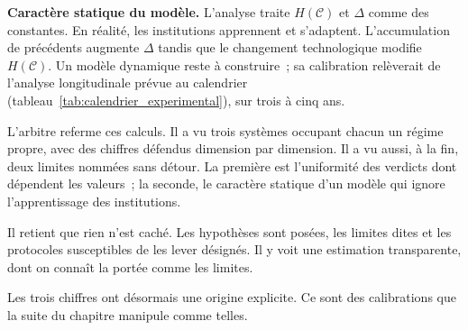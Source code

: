 \begin{sloppypar}
\noindent\textbf{Caract\`ere statique du mod\`ele.} L'analyse traite
$H(\mathcal{C})$ et $\Delta$ comme des constantes. En r\'ealit\'e, les
institutions apprennent et s'adaptent. L'accumulation de pr\'ec\'edents
augmente $\Delta$ tandis que le changement technologique modifie $H(\mathcal{C})$. Un
mod\`ele dynamique reste \`a construire~; sa calibration rel\`everait de l'analyse
longitudinale pr\'evue au calendrier (tableau~\ref{tab:calendrier_experimental}),
sur trois \`a cinq ans.

\begin{boiteArbitre}
L'arbitre referme ces calculs. Il a vu trois syst\`emes occupant chacun un r\'egime
propre, avec des chiffres d\'efendus dimension par dimension. Il a vu aussi, \`a la fin,
deux limites nomm\'ees sans d\'etour. La premi\`ere est l'uniformit\'e des verdicts dont
d\'ependent les valeurs~; la seconde, le caract\`ere statique d'un mod\`ele qui ignore
l'apprentissage des institutions.

Il retient que rien n'est cach\'e. Les hypoth\`eses sont pos\'ees, les limites
dites et les protocoles susceptibles de les lever d\'esign\'es. Il y voit une estimation
transparente, dont on conna\^it la port\'ee comme les limites.

Les trois chiffres ont d\'esormais une origine explicite. Ce sont des
calibrations que la suite du chapitre manipule comme telles.
\end{boiteArbitre}
\end{sloppypar}